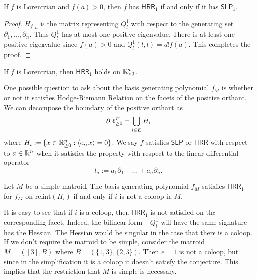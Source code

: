 \documentclass[12pt]{article}
\begin{document}
\begin{lem} 
	If $f$ is Lorentzian and $f(a) > 0$, then $f$ has $\mathsf{HRR}_1$ if and only if it has $\mathsf{SLP}_1$. 
\end{lem}

\begin{proof}
	$H_f|_a$ is the matrix representing $Q_l^1$ with respect to the generating set $\partial_1, \ldots, \partial_n$. Thus $Q_l^1$ has at most one positive eigenvalue. There is at least one positive eigenvalue since $f(a) > 0$ and $Q_l^1(l, l) = d!f(a)$. This completes the proof. 
\end{proof}

\begin{lem}
	If $f$ is Lorentzian, then $\mathsf{HRR}_1$ holds on $\mathbb{R}_{> 0}^n$. 
\end{lem}

One possible question to ask about the basis generating polynomial $f_M$ is whether or not it satisfies Hodge-Riemann Relation on the facets of the positive orthant. We can decompose the boundary of the positive orthant as 
\[
	\partial \mathbb{R}_{\geq 0}^E = \bigcup_{i \in E} H_i
\]
where $H_i := \{x \in \mathbb{R}_{\geq 0}^n : \langle e_i, x \rangle = 0\}$. We say $f$ satisfies $\mathsf{SLP}$ or $\mathsf{HRR}$ with respect to $a \in \mathbb{R}^n$ when it satisfies the property with respect to the linear differential operator
\[
	l_a := a_1 \partial_1 + \ldots + a_n \partial_n. 
\]

\begin{conj} \label{HRR-conjecture}
	Let $M$ be a simple matroid. The basis generating polynomial $f_M$ satisfies $\mathsf{HRR}_1$ for $f_M$ on $\text{relint}(H_i)$ if and only if $i$ is not a coloop in $M$. 
\end{conj}

It is easy to see that if $i$ is a coloop, then $\mathsf{HRR}_1$ is not satisfied on the corresponding facet. Indeed, the bilinear form $-Q^1_l$ will have the same signature has the Hessian. The Hessian would be singular in the case that there is a coloop. If we don't require the matroid to be simple, consider the matroid $M = ([3], B)$ where $B = (\{1, 3\}, \{2, 3\})$. Then $e = 1$ is not a coloop, but since in the simplification it is a coloop it doesn't satisfy the conjecture. This implies that the restriction that $M$ is simple is necessary. 
\end{document}
